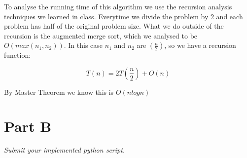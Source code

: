 \documentclass[12pt,twoside]{article}
\begin{document}
\begin{problems}
\begin{problemparts}
To analyse the running time of this algorithm we use the recursion analysis techniques we learned in class. Everytime we divide the problem by 2 and each problem has half of the original problem size. What we do outside of the recursion is the augmented merge sort, which we analysed to be $O(max (n_1, n_2))$. In this case $n_1$ and $n_2$ are $(\frac{n}{2})$, so we have a recursion function:

\vspace{2mm}

$$T(n) = 2T(\frac{n}{2}) + O(n)$$

\vspace{2mm}

By Master Theorem we know this is $ O(nlogn)$

\vspace{2mm}

\end{problemparts}


\problem  %
\begin{problemparts}
\problempart
\problempart
\problempart
\problempart
\end{problemparts}

\section*{Part B}
\problem  %
\begin{problemparts}
\emph{Submit your implemented python script.}
\problempart
\problempart
\problempart
\problempart
\problempart
\end{problemparts}
\end{problems}
\end{document}
